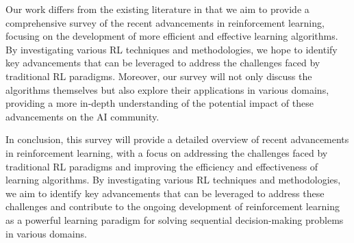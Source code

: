 Our work differs from the existing literature in that we aim to provide a comprehensive survey of the recent advancements in reinforcement learning, focusing on the development of more efficient and effective learning algorithms. By investigating various RL techniques and methodologies, we hope to identify key advancements that can be leveraged to address the challenges faced by traditional RL paradigms. Moreover, our survey will not only discuss the algorithms themselves but also explore their applications in various domains, providing a more in-depth understanding of the potential impact of these advancements on the AI community.

In conclusion, this survey will provide a detailed overview of recent advancements in reinforcement learning, with a focus on addressing the challenges faced by traditional RL paradigms and improving the efficiency and effectiveness of learning algorithms. By investigating various RL techniques and methodologies, we aim to identify key advancements that can be leveraged to address these challenges and contribute to the ongoing development of reinforcement learning as a powerful learning paradigm for solving sequential decision-making problems in various domains.